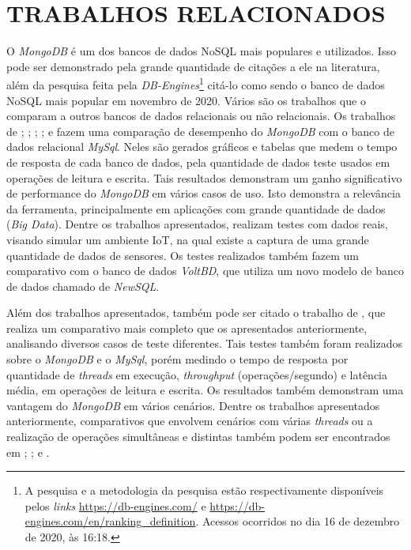 \chapter{TRABALHOS RELACIONADOS}
\label{TrabalhosRelacionados}

O \textit{MongoDB} é um dos bancos de dados NoSQL mais populares e utilizados. Isso pode ser demonstrado pela grande quantidade de citações a ele na literatura, além da pesquisa feita pela \textit{DB-Engines}\footnote{A pesquisa e a metodologia da pesquisa estão respectivamente disponíveis pelos \textit{links} \url{https://db-engines.com/} e \url{https://db-engines.com/en/ranking_definition}. Acessos ocorridos no dia 16 de dezembro de 2020, às 16:18.} citá-lo como sendo o banco de dados NoSQL mais popular em novembro de 2020. Vários são os trabalhos que o comparam a outros bancos de dados relacionais ou não relacionais. Os trabalhos de ; ; ; ; e  fazem uma comparação de desempenho do \textit{MongoDB} com o banco de dados relacional \textit{MySql}. Neles são gerados gráficos e tabelas que medem o tempo de resposta de cada banco de dados, pela quantidade de dados teste usados em operações de leitura e escrita. Tais resultados demonstram um ganho significativo de performance do \textit{MongoDB} em vários casos de uso. Isto demonstra a relevância da ferramenta, principalmente em aplicações com grande quantidade de dados (\textit{Big Data}). Dentre os trabalhos apresentados,  realizam testes com dados reais, visando simular um ambiente IoT, na qual existe a captura de uma grande quantidade de dados de sensores. Os testes realizados também fazem um comparativo com o banco de dados \textit{VoltBD}, que utiliza um novo modelo de banco de dados chamado de \textit{NewSQL}.

Além dos trabalhos apresentados, também pode ser citado o trabalho de , que realiza um comparativo mais completo que os apresentados anteriormente, analisando diversos casos de teste diferentes. Tais testes também foram realizados sobre o \textit{MongoDB} e o \textit{MySql}, porém medindo o tempo de resposta por quantidade de \textit{threads} em execução, \textit{throughput} (operações/segundo) e latência média, em operações de leitura e escrita. Os resultados também demonstram uma vantagem do \textit{MongoDB} em vários cenários. Dentre os trabalhos apresentados anteriormente, comparativos que envolvem cenários com várias \textit{threads} ou a realização de operações simultâneas e distintas também podem ser encontrados em ; ; e .

